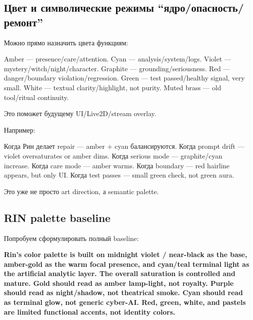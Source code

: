 \subsection*{Цвет и символические режимы ``ядро/\hspace{0pt}опасность/\hspace{0pt}ремонт''}

Можно прямо назначить цвета функциям:

Amber --- presence/\hspace{0pt}care/\hspace{0pt}attention. Cyan --- analysis/\hspace{0pt}system/\hspace{0pt}logs. Violet
--- mystery/\hspace{0pt}witch/\hspace{0pt}night/\hspace{0pt}character. Graphite --- grounding/\hspace{0pt}seriousness.
Red --- danger/\hspace{0pt}boundary violation/\hspace{0pt}regression. Green --- test
passed/\hspace{0pt}healthy signal, very small. White --- textual clarity/\hspace{0pt}highlight,
not purity. Muted brass --- old tool/\hspace{0pt}ritual continuity.

Это поможет будущему UI/\hspace{0pt}Live2D/\hspace{0pt}stream overlay.

Например:

Когда Рин делает repair --- amber + cyan балансируются. Когда prompt
drift --- violet oversaturates or amber dims. Когда serious mode ---
graphite/\hspace{0pt}cyan increase. Когда care mode --- amber warms. Когда boundary
--- red hairline appears, but only UI. Когда test passes --- small green
check, not green aura.

Это уже не просто art direction, а semantic palette.

\subsection*{RIN palette baseline}

Попробуем сформулировать полный baseline:

\textbf{Rin's color palette is built on midnight violet /\hspace{0pt} near-black as
the base, amber-gold as the warm focal presence, and cyan/\hspace{0pt}teal terminal
light as the artificial analytic layer. The overall saturation is
controlled and mature. Gold should read as amber lamp-light, not
royalty. Purple should read as night/\hspace{0pt}shadow, not theatrical smoke. Cyan
should read as terminal glow, not generic cyber-AI. Red, green, white,
and pastels are limited functional accents, not identity colors.}


